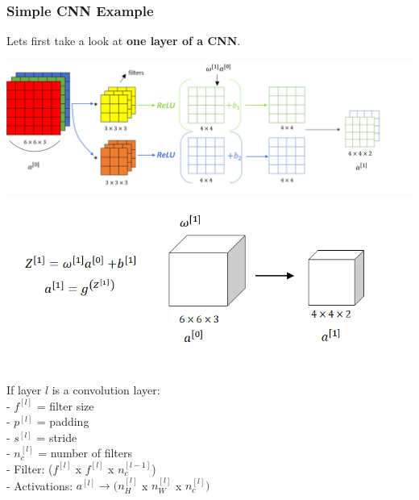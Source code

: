 \documentclass[11pt, a4paper]{article}
\begin{document}
\begin{spacing}{1.1}
	\subsubsection{Simple CNN Example}
	Lets first take a look at \textbf{one layer of a CNN}.
	\begin{center}
	\includegraphics[scale=.6]{cnn_layer} \\
	\includegraphics[scale=.5]{cnn_layer_2} \\
	\end{center}
	If layer $l$ is a convolution layer: \vspace*{.5mm}\\
	\hspace*{3mm} - $f^{[l]}$ = filter size\vspace*{.5mm} \\
	\hspace*{3mm} - $p^{[l]}$ = padding \vspace*{.5mm}\\
	\hspace*{3mm} - $s^{[l]}$ = stride \vspace*{.5mm}\\
	\hspace*{3mm} - $n_c^{[l]}$ = number of filters \vspace*{.5mm}\\
	\hspace*{3mm} - Filter: ($f^{[l]}$ x $f^{[l]}$ x $n_c^{[l-1]}$)\vspace*{.5mm} \\
	\hspace*{3mm} - Activations: $a^{[l]} \rightarrow (n^{[l]}_H$ x $n^{[l]}_W$ x $n_c^{[l]})$\vspace*{1mm} \\

\end{spacing}
\end{document}
